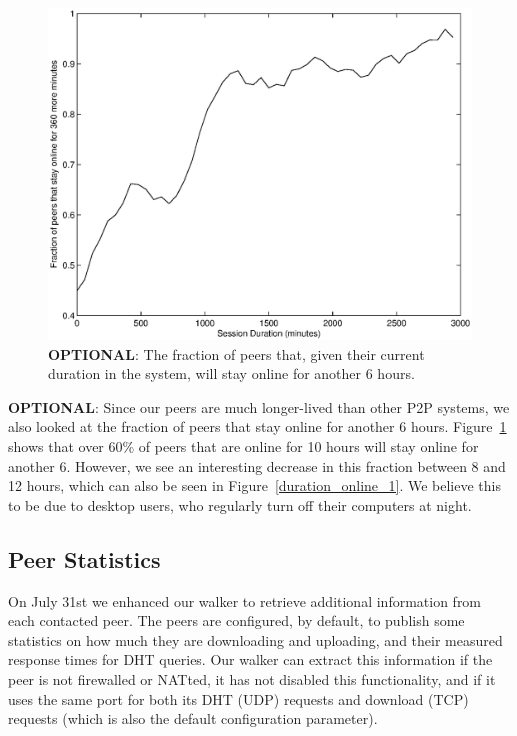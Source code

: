 \documentclass[conference]{IEEEtran}
\begin{document}
\begin{figure}
\centering
\includegraphics[width=\columnwidth]{AptP2PDuration-online_6.eps}
\caption{\textbf{OPTIONAL}: The fraction of peers that, given their current duration in
the system, will stay online for another 6 hours.}
\label{duration_online_6}
\end{figure}

\textbf{OPTIONAL}: Since our peers are much longer-lived than other P2P systems, we
also looked at the fraction of peers that stay online for another 6
hours. Figure~\ref{duration_online_6} shows that over 60\% of peers
that are online for 10 hours will stay online for another 6.
However, we see an interesting decrease in this fraction between 8
and 12 hours, which can also be seen in
Figure~\ref{duration_online_1}. We believe this to be due to desktop
users, who regularly turn off their computers at night.

\subsection{Peer Statistics}
\label{peer_stats}

On July 31st we enhanced our walker to retrieve additional
information from each contacted peer. The peers are configured, by
default, to publish some statistics on how much they are downloading
and uploading, and their measured response times for DHT queries.
Our walker can extract this information if the peer is not
firewalled or NATted, it has not disabled this functionality, and if
it uses the same port for both its DHT (UDP) requests and download
(TCP) requests (which is also the default configuration parameter).
\end{document}
